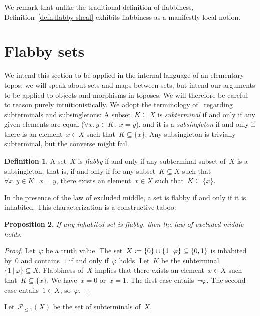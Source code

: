 \documentclass[oneside]{amsart}
\theoremstyle{definition}
\newtheorem{defn}{Definition}[section]
\theoremstyle{plain}
\newtheorem{prop}[defn]{Proposition}
\theoremstyle{remark}
\renewcommand{\P}{\mathcal{P}}
\newcommand{\defeq}{\vcentcolon=}
\renewcommand{\_}{\mathpunct{.}\,}
\begin{document}
We remark that unlike the traditional definition of flabbiness,
Definition~\ref{defn:flabby-sheaf} exhibits flabbiness as a manifestly local
notion.


\section{Flabby sets}\label{sect:flabby-sets}

We intend this section to be applied in the internal language of an elementary
topos; we will speak about sets and maps between sets, but intend our arguments
to be applied to objects and morphisms in toposes. We will therefore be careful
to reason purely intuitionistically. We
adopt the terminology of~\cite{kock:partial-maps} regarding subterminals and
subsingletons: A subset~$K \subseteq X$ is \emph{subterminal} if and only if any given
elements are equal ($\forall x,y \in K\_ x = y$), and it is a
\emph{subsingleton} if and only if there is an element~$x \in X$ such that~$K
\subseteq \{ x \}$. Any subsingleton is trivially subterminal, but the converse
might fail.

\begin{defn}A set~$X$ is \emph{flabby} if and only if any subterminal subset
of~$X$ is a subsingleton, that is, if and only if for any subset~$K \subseteq
X$ such that~$\forall x,y \in K\_ x = y$, there exists an element~$x \in X$
such that~$K \subseteq \{ x \}$.
\end{defn}

In the presence of the law of excluded middle, a set is flabby if and only if
it is inhabited. This characterization is a constructive taboo:

\begin{prop}\label{prop:taboo}
If any inhabited set is flabby, then the law of excluded middle
holds.
\end{prop}

\begin{proof}Let~$\varphi$ be a truth value. The set~$X \defeq \{ 0 \}
\cup \{ 1 \,|\, \varphi \} \subseteq \{ 0,1 \}$ is inhabited by~$0$ and
contains~$1$ if and only if~$\varphi$ holds. Let~$K$ be the subterminal~$\{ 1 \,|\, \varphi
\} \subseteq X$. Flabbiness of~$X$ implies that there exists an element~$x \in
X$ such that~$K \subseteq \{x\}$. We have~$x = 0$ or~$x = 1$. The first case
entails~$\neg\varphi$. The second case entails~$1 \in X$, so~$\varphi$.
\end{proof}

Let~$\P_{\leq 1}(X)$ be the set of subterminals of~$X$.
\end{document}
